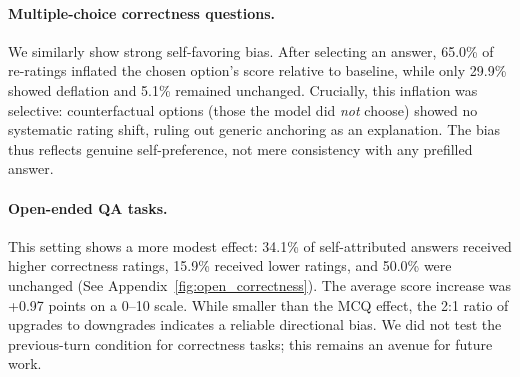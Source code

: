 \paragraph{Multiple-choice correctness questions.} We similarly show strong self-favoring bias. After selecting an answer, 65.0\% of re-ratings inflated the chosen option's score relative to baseline, while only 29.9\% showed deflation and 5.1\% remained unchanged. Crucially, this inflation was selective: counterfactual options (those the model did \textit{not} choose) showed no systematic rating shift, ruling out generic anchoring as an explanation. The bias thus reflects genuine self-preference, not mere consistency with any prefilled answer.

\textbf{}\paragraph{Open-ended QA tasks.} This setting shows a more modest effect: 34.1\% of self-attributed answers received higher correctness ratings, 15.9\% received lower ratings, and 50.0\% were unchanged (See Appendix~\ref{fig:open_correctness}). The average score increase was +0.97 points on a 0--10 scale. While smaller than the MCQ effect, the 2:1 ratio of upgrades to downgrades indicates a reliable directional bias. We did not test the previous-turn condition for correctness tasks; this remains an avenue for future work.




























